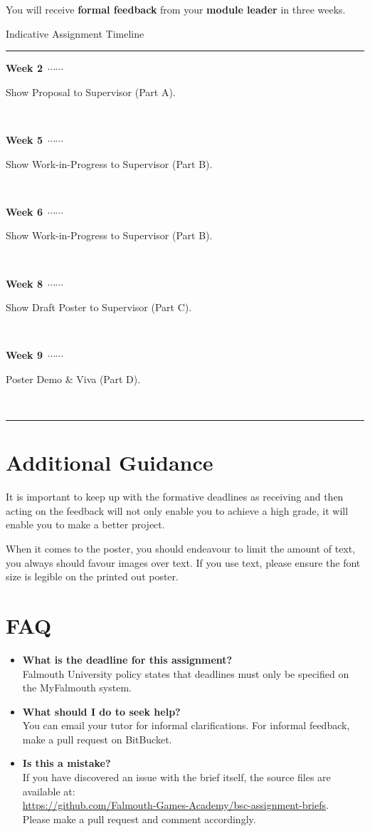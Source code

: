 \documentclass{../../fal_assignment}
\newcommand\ytl[2]{
\parbox[b]{8em}{\hfill{\color{black}\bfseries\sffamily #1}~$\cdots\cdots$~}\makebox[0pt][c]{$\bullet$}\vrule\quad \parbox[c]{4.5cm}{\vspace{7pt}\color{black}\raggedright\sffamily #2.\\[7pt]}\\[-3pt]}
\begin{document}
You will receive \textbf{formal feedback} from your \textbf{module leader} in three weeks.

\begin{table}[!ht]
\caption{Indicative Assignment Timeline}
\centering
\begin{minipage}[t]{.7\linewidth}
\color{black}
\rule{\linewidth}{1pt}
\ytl{Week 2}{Show Proposal to Supervisor (Part A)}
\ytl{Week 5}{Show Work-in-Progress to Supervisor (Part B)}
\ytl{Week 6}{Show Work-in-Progress to Supervisor (Part B)}
\ytl{Week 8}{Show Draft Poster to Supervisor (Part C)}
\ytl{Week 9}{Poster Demo \& Viva (Part D)}
\bigskip
\rule{\linewidth}{1pt}%
\end{minipage}%
\end{table}

\section*{Additional Guidance}

It is important to keep up with the formative deadlines as receiving and then
acting on the feedback will not only enable you to achieve a high grade, it
will enable you to make a better project.

When it comes to the poster, you should endeavour to limit the amount of text,
you always should favour images over text. If you use text, please ensure the
font size is legible on the printed out poster.

\section*{FAQ}

\begin{itemize}
	\item 	\textbf{What is the deadline for this assignment?} \\ 
    		Falmouth University policy states that deadlines must only be specified on the MyFalmouth system.
    		
	\item 	\textbf{What should I do to seek help?} \\ 
    		You can email your tutor for informal clarifications. For informal feedback, make a pull request on BitBucket. 
    		
    	\item 	\textbf{Is this a mistake?} \\ 	
    		If you have discovered an issue with the brief itself, the source files are available at: \\
    		\url{https://github.com/Falmouth-Games-Academy/bsc-assignment-briefs}.\\
    		 Please make a pull request and comment accordingly.
\end{itemize}
\end{document}
